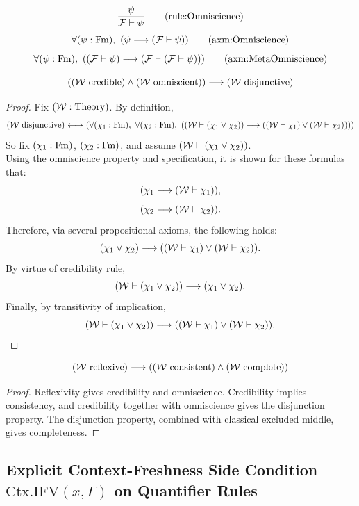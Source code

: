 \begin{inferencerule}[omniscience]%
\[
\frac{
\psi
}{
\Fau \vdash \psi
}
\labeltagd{rule}{Omniscience}
\]%
\[
\forall (\psi:\Fm),\ %
(
\psi
\implies
(\mathcal{F}\vdash\psi)
)
\labeltagd{axm}{Omniscience}
\]
\[
\forall (\psi:\Fm),\ %
(
(\mathcal{F}\vdash\psi)
\implies
(\mathcal{F}\vdash(\mathcal{F}\vdash\psi))
)
\labeltagd{axm}{MetaOmniscience}
\]
\end{inferencerule}
\begin{lemma}
\[
(
({\mathcal{W}}\text{ credible})
\land
({\mathcal{W}}\text{ omniscient})
)
\longrightarrow
({\mathcal{W}}\text{ disjunctive})
\]
\end{lemma}
\begin{proof}
Fix $({\mathcal{W}}:{\text{Theory}})$. By definition,
\[
(\Wau\text{ disjunctive})
\iff
(
\forall (\chi_1:\Fm),\ %
\forall (\chi_2:\Fm),\ %
((\Wau \vdash (\chi_1\lor\chi_2))
\implies
(
(\Wau \vdash \chi_1)
\lor 
(\Wau \vdash \chi_2)
))
)
\]
So fix $(\chi_1:\mathrm{Fm})$, $(\chi_2:\mathrm{Fm})$, and assume $({\mathcal{W}} \vdash (\chi_1\lor\chi_2))$.\\
Using the omniscience property and specification, it is shown for these formulas that:
\[
(
\chi_1
\longrightarrow
({\mathcal{W}}\vdash\chi_1)
),
\]
\[
(
\chi_2
\longrightarrow
({\mathcal{W}}\vdash\chi_2)
).
\]
Therefore, via several propositional axioms, the following holds:
\[
(\chi_1\lor \chi_2)
\longrightarrow
(({\mathcal{W}}\vdash\chi_1)\lor({\mathcal{W}}\vdash\chi_2)).
\]
By virtue of credibility rule,
\[
({\mathcal{W}}\vdash(\chi_1\lor \chi_2))
\longrightarrow
(\chi_1\lor \chi_2).
\]
Finally, by transitivity of implication, 
\[
({\mathcal{W}}\vdash(\chi_1\lor \chi_2))
\longrightarrow
(({\mathcal{W}}\vdash\chi_1)\lor({\mathcal{W}}\vdash\chi_2)).
\]
\end{proof}
\begin{theorem}
\[
({\mathcal{W}}\text{ reflexive})
\longrightarrow
(
({\mathcal{W}}\text{ consistent})
\land
({\mathcal{W}}\text{ complete})
)
\]
\end{theorem}
\begin{proof}
Reflexivity gives credibility and omniscience. Credibility implies
consistency, and credibility together with omniscience gives the disjunction
property. The disjunction property, combined with classical excluded middle,
gives completeness.
\end{proof}

\subsection{Explicit Context-Freshness Side Condition $\mathrm{Ctx.IFV}(x,\Gamma)$ on Quantifier Rules}
\label{subsec:ctx_ifv_quantifier_hygiene}

